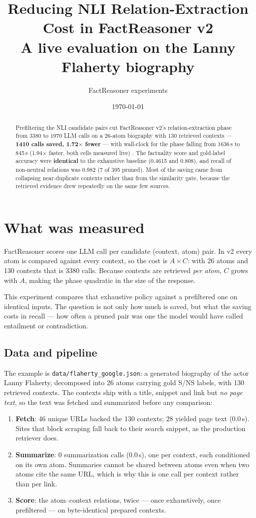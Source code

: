 \documentclass[11pt]{article}
\title{Reducing NLI Relation-Extraction Cost in FactReasoner v2\\\large A live evaluation on the Lanny Flaherty biography}
\author{FactReasoner experiments}
\date{\today}
\begin{document}
\maketitle
\begin{abstract}
Prefiltering the NLI candidate pairs cut FactReasoner v2's relation-extraction phase from 3380 to 1970 LLM calls on a 26-atom biography with 130 retrieved contexts --- \textbf{1410 calls saved, 1.72$\times$ fewer} --- with wall-clock for the phase falling from 1636\,s to 845\,s (1.94$\times$ faster, both cells measured live) . The factuality score and gold-label accuracy were \textbf{identical} to the exhaustive baseline (0.4615 and 0.808), and recall of non-neutral relations was 0.982 (7 of 395 pruned). Most of the saving came from collapsing near-duplicate contexts rather than from the similarity gate, because the retrieved evidence drew repeatedly on the same few sources.
\end{abstract}
\section{What was measured}
FactReasoner scores one LLM call per candidate (context, atom) pair. In v2 every atom is compared against every context, so the cost is $A \times C$: with 26 atoms and 130 contexts that is 3380 calls. Because contexts are retrieved \emph{per atom}, $C$ grows with $A$, making the phase quadratic in the size of the response.

This experiment compares that exhaustive policy against a prefiltered one on identical inputs. The question is not only how much is saved, but what the saving costs in recall --- how often a pruned pair was one the model would have called entailment or contradiction.

\subsection{Data and pipeline}
The example is \texttt{data/flaherty\_google.json}: a generated biography of the actor Lanny Flaherty, decomposed into 26 atoms carrying gold S/NS labels, with 130 retrieved contexts. The contexts ship with a title, snippet and link but \emph{no page text}, so the text was fetched and summarized before any comparison:
\begin{enumerate}
  \item \textbf{Fetch}: 46 unique URLs backed the 130 contexts; 28 yielded page text (0.0\,s). Sites that block scraping fall back to their search snippet, as the production retriever does.
  \item \textbf{Summarize}: 0 summarization calls (0.0\,s), one per context, each conditioned on its own atom. Summaries cannot be shared between atoms even when two atoms cite the same URL, which is why this is one call per context rather than per link.
  \item \textbf{Score}: the atom--context relations, twice --- once exhaustively, once prefiltered --- on byte-identical prepared contexts.
\end{enumerate}
\end{document}
